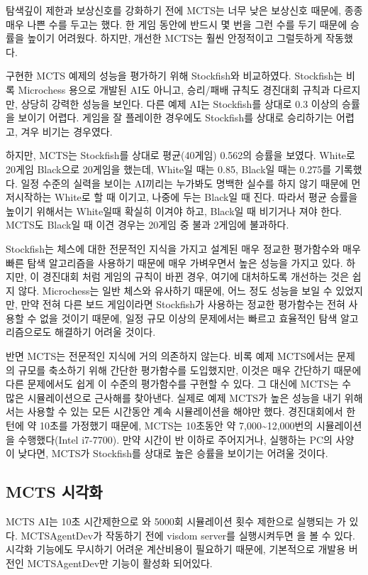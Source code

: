 \documentclass[letterpaper,10pt,english]{sphinxmanual}
\begin{document}
탐색깊이 제한과 보상신호를 강화하기 전에 MCTS는 너무 낮은 보상신호 때문에, 종종 매우 나쁜 수를 두고는 했다.
한 게임 동안에 반드시 몇 번을 그런 수를 두기 때문에 승률을 높이기 어려웠다.
하지만, 개선한 MCTS는 훨씬 안정적이고 그럴듯하게 작동했다.

구현한 MCTS 예제의 성능을 평가하기 위해 Stockfish와 비교하였다.
Stockfish는 비록 Microchess 용으로 개발된 AI도 아니고, 승리/패배 규칙도 경진대회 규칙과 다르지만,
상당히 강력한 성능을 보인다. 다른 예제 AI는 Stockfish를 상대로 0.3 이상의 승률을 보이기 어렵다.
게임을 잘 플레이한 경우에도 Stockfish를 상대로 승리하기는 어렵고, 겨우 비기는 경우였다.

하지만, MCTS는 Stockfish를 상대로 평균(40게임) 0.562의 승률을 보였다. White로 20게임 Black으로 20게임을 했는데,
White일 때는 0.85, Black일 때는 0.275를 기록했다. 일정 수준의 실력을 보이는 AI끼리는 누가봐도 명백한 실수를 하지 않기
때문에 먼저시작하는 White로 할 때 이기고, 나중에 두는 Black일 때 진다.
따라서 평균 승률을 높이기 위해서는 White일때 확실히 이겨야 하고, Black일 때 비기거나 져야 한다.
MCTS도 Black일 때 이견 경우는 20게임 중 불과 2게임에 불과하다.

Stockfish는 체스에 대한 전문적인 지식을 가지고 설계된 매우 정교한 평가함수와
매우 빠른 탐색 알고리즘을 사용하기 때문에 매우 가벼우면서 높은 성능을 가지고 있다.
하지만, 이 경진대회 처럼 게임의 규칙이 바뀐 경우, 여기에 대처하도록 개선하는 것은 쉽지 않다.
Microchess는 일반 체스와 유사하기 때문에, 어느 정도 성능을 보일 수 있었지만, 만약 전혀 다른 보드 게임이라면
Stockfish가 사용하는 정교한 평가함수는 전혀 사용할 수 없을 것이기 때문에, 일정 규모 이상의 문제에서는 빠르고 효율적인
탐색 알고리즘으로도 해결하기 어려울 것이다.

반면 MCTS는 전문적인 지식에 거의 의존하지 않는다. 비록 예제 MCTS에서는 문제의 규모를 축소하기 위해
간단한 평가함수를 도입했지만, 이것은 매우 간단하기 때문에 다른 문제에서도 쉽게 이 수준의 평가함수를 구현할 수 있다.
그 대신에 MCTS는 수 많은 시뮬레이션으로 근사해를 찾아낸다.
실제로 예제 MCTS가 높은 성능을 내기 위해서는 사용할 수 있는 모든 시간동안 계속 시뮬레이션을 해야만 했다.
경진대회에서 한 턴에 약 10초를 가정했기 때문에, MCTS는 10초동안 약 7,000\textasciitilde{}12,000번의 시뮬레이션을 수행했다(Intel i7-7700).
만약 시간이 반 이하로 주어지거나, 실행하는 PC의 사양이 낮다면, MCTS가 Stockfish를 상대로 높은 승률을 보이기는 어려울 것이다.


\subsection{MCTS 시각화}
\label{\detokenize{04-mcts:id4}}
MCTS AI는 10초 시간제한으로 {\hyperref[\detokenize{agents.search:agents.search.mcts_agent.MCTSAgent}]{}} 와 5000회 시뮬레이션 횟수 제한으로 실행되는
{\hyperref[\detokenize{agents.search:agents.search.mcts_agent.MCTSAgentDev}]{}} 가 있다.
MCTSAgentDev가 작동하기 전에 visdom server를 실행시켜두면 {\hyperref[\detokenize{04-mcts:mcts-visualization}]{}} 을 볼 수 있다.
시각화 기능에도 무시하기 어려운 계산비용이 필요하기 때문에, 기본적으로 개발용 버전인 MCTSAgentDev만 기능이 활성화 되어있다.
\end{document}
